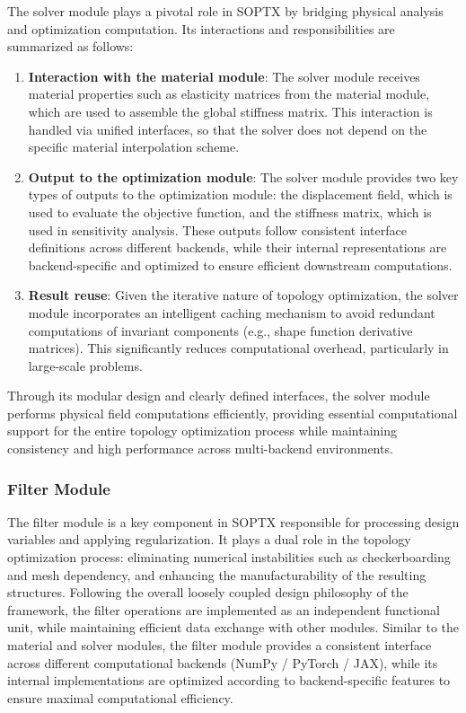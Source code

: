 \documentclass[mathpazo]{cicp}
\begin{document}
The solver module plays a pivotal role in SOPTX by bridging physical analysis and optimization computation. Its interactions and responsibilities are summarized as follows:
\begin{enumerate}
	\item \textbf{Interaction with the material module}: The solver module receives material properties such as elasticity matrices from the material module, which are used to assemble the global stiffness matrix. This interaction is handled via unified interfaces, so that the solver does not depend on the specific material interpolation scheme.
	\item \textbf{Output to the optimization module}: The solver module provides two key types of outputs to the optimization module: the displacement field, which is used to evaluate the objective function, and the stiffness matrix, which is used in sensitivity analysis. These outputs follow consistent interface definitions across different backends, while their internal representations are backend-specific and optimized to ensure efficient downstream computations.
	\item \textbf{Result reuse}: Given the iterative nature of topology optimization, the solver module incorporates an intelligent caching mechanism to avoid redundant computations of invariant components (e.g., shape function derivative matrices). This significantly reduces computational overhead, particularly in large-scale problems.
\end{enumerate}
Through its modular design and clearly defined interfaces, the solver module performs physical field computations efficiently, providing essential computational support for the entire topology optimization process while maintaining consistency and high performance across multi-backend environments.

\subsubsection{Filter Module}
The filter module is a key component in SOPTX responsible for processing design variables and applying regularization. It plays a dual role in the topology optimization process: eliminating numerical instabilities such as checkerboarding and mesh dependency, and enhancing the manufacturability of the resulting structures. Following the overall loosely coupled design philosophy of the framework, the filter operations are implemented as an independent functional unit, while maintaining efficient data exchange with other modules. Similar to the material and solver modules, the filter module provides a consistent interface across different computational backends (NumPy / PyTorch / JAX), while its internal implementations are optimized according to backend-specific features to ensure maximal computational efficiency.
\end{document}
